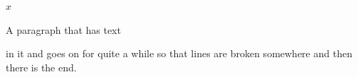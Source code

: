 \documentclass{article}
\begin{document}
\hbox{$x$}
\begin{center}
\end{center}
A paragraph that has text  in it and goes on for quite a while so that lines are broken somewhere and then there is the end.
\end{document}
